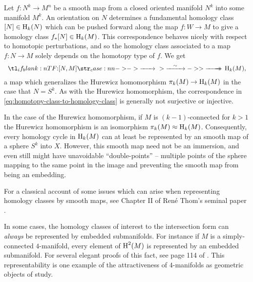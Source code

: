 Let $f : N^k\to M^n$ be a smooth map from a closed oriented manifold $N^k$ into some manifold $M^k$. An orientation on $N$ determines a fundamental homology class $[N]\in \operatorname{H}_k(N)$ which can be pushed forward along the map $f : W \to M$ to give a homology class $f_* [N]\in \operatorname{H}_k(M)$.
This correspondence behaves nicely with respect to homotopic perturbations, and so
the homology class associated to a map $f : N \to M$ solely depends on the homotopy type of $f$. We get
\begin{equation}\label{eq:homotopy-class-to-homology-class}
	\lkxfunc{}{[N,M]}{\H_k(M),}
\end{equation}
a map which generalizes the Hurewicz homomorphism $\pi_k(M) \to \operatorname{H}_k(M)$ in the case that $N=S^k$.
As with the Hurewicz homomorphism, the correspondence in \cref{eq:homotopy-class-to-homology-class} is generally not surjective or injective.

In the case of the Hurewicz homomorphism, if $M$ is $(k-1)$-connected for $k > 1$ the Hurewicz homomorphism is an isomorphism $\pi_{k}(M) \approx \operatorname{H}_{k}(M)$. Consequently, every homology cycle in $\operatorname{H}_{k}(M)$ can at least be represented by an smooth map of a sphere $S^{k}$ into $X$. However, this smooth map need not be an immersion, and even still might have unavoidable ``double-points'' -- multiple points of the sphere mapping to the same point in the image and preventing the smooth map from being an embedding.

\begin{remark*}
	For a classical account of some issues which can arise when representing homology classes by smooth maps, see Chapter II of Ren\'e Thom's seminal paper \cite{thom1954}.
\end{remark*}

\begin{remark*}\label{rmk:homology-dimension-4-embedding}
	In some cases, the homology classes of interest to the intersection form can \emph{always} be represented by embedded submanifolds. For instance if $M$ is a simply-connected $4$-manifold, every element of $\operatorname{H}^2(M)$ is represented by an embedded submanifold. For several elegant proofs of this fact, see page 114 of \cite{scorpan2005wild}.
	This representability is one example of the attractiveness of $4$-manifolds as geometric objects of study.
\end{remark*}

